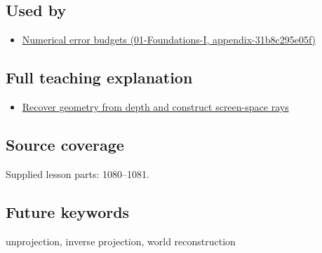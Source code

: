 \subsection{Used by}\label{appendix-2cbf2968e866-used-by}

\begin{itemize}
\tightlist
\item
  \href{../01-Foundations-I/main.pdf\#nameddest=appendix-31b8c295e05f}{Numerical error budgets (01-Foundations-I, appendix-31b8c295e05f)}
\end{itemize}

\subsection{Full teaching explanation}\label{appendix-2cbf2968e866-full-teaching-explanation}

\begin{itemize}
\tightlist
\item
  \hyperref[02-foundations-ii-ch035-recover-geometry-from-depth-and-construct-screen-space-rays]{Recover geometry from depth and construct screen-space rays}
\end{itemize}

\subsection{Source coverage}\label{appendix-2cbf2968e866-source-coverage}

Supplied lesson parts: 1080--1081.

\subsection{Future keywords}\label{appendix-2cbf2968e866-future-keywords}

unprojection, inverse projection, world reconstruction
